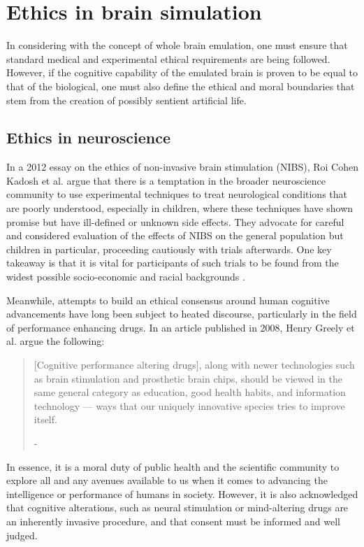 \section{Ethics in brain simulation}

In considering with the concept of whole brain emulation, one must ensure that
standard medical and experimental ethical requirements are being followed.
However, if the cognitive capability of the emulated brain is proven to be equal
to that of the biological, one must also define the ethical and moral boundaries
that stem from the creation of possibly sentient artificial life. 

\subsection{Ethics in neuroscience}

In a 2012 essay on the ethics of non-invasive brain stimulation (NIBS), Roi
Cohen Kadosh et al. argue that there is a temptation in the broader neuroscience
community to use experimental techniques to treat neurological conditions that
are poorly understood, especially in children, where these techniques have shown
promise but have ill-defined or unknown side effects. They advocate for careful
and considered evaluation of the effects of NIBS on the general population but
children in particular, proceeding cautiously with trials afterwards. One key
takeaway is that it is vital for participants of such trials to be found from
the widest possible socio-economic and racial backgrounds
\autocite{kadosh_neuroethics_2012}. 

Meanwhile, attempts to build an ethical consensus around human cognitive
advancements have long been subject to heated discourse, particularly in the
field of performance enhancing drugs. In an article published in 2008, Henry
Greely et al. argue the following:

\begin{quote}
    [Cognitive performance altering drugs], along with newer technologies such
    as brain stimulation and prosthetic brain chips, should be viewed in the
    same general category as education, good health habits, and information
    technology — ways that our uniquely innovative species tries to improve
    itself.
    \begin{flushright}
        -\textit{\autocite{greely_towards_2008}}
    \end{flushright}
\end{quote}

In essence, it is a moral duty of public health and the scientific
community to explore all and any avenues available to us when it comes to
advancing the intelligence or performance of humans in society. However, it is
also acknowledged that cognitive alterations, such as neural stimulation or
mind-altering drugs are an inherently invasive procedure, and that consent must
be informed and well judged. 

